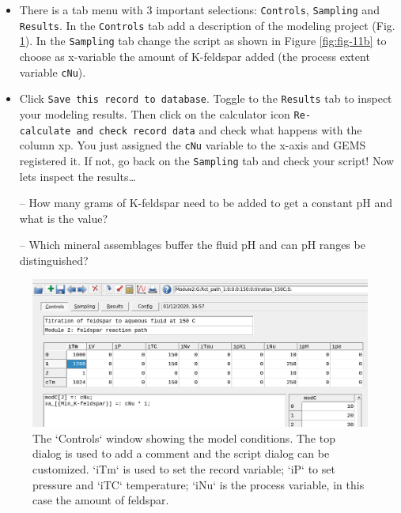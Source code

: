 \documentclass[
]{book}
\begin{document}
\begin{itemize}
\item
  There is a tab menu with 3 important selections: \texttt{Controls}, \texttt{Sampling} and \texttt{Results}. In the \texttt{Controls} tab add a description of the modeling project (Fig. \ref{fig:fig-10b}). In the \texttt{Sampling} tab change the script as shown in Figure \ref{fig:fig-11b} to choose as x-variable the amount of K-feldspar added (the process extent variable \texttt{cNu}).
\item
  Click \texttt{Save\ this\ record\ to\ database}. Toggle to the \texttt{Results} tab to inspect your modeling results. Then click on the calculator icon \texttt{Re-calculate\ and\ check\ record\ data} and check what happens with the column xp. You just assigned the \texttt{cNu} variable to the x-axis and GEMS registered it. If not, go back on the \texttt{Sampling} tab and check your script! Now lets inspect the results\ldots{}

  -- How many grams of K-feldspar need to be added to get a constant pH and what is the value?

  -- Which mineral assemblages buffer the fluid pH and can pH ranges be distinguished?
\end{itemize}

\begin{figure}
\includegraphics[width=1\linewidth]{figures/module2/fig-10} \caption{The `Controls` window showing the model conditions. The top dialog is used to add a comment and the script dialog can be customized. `iTm` is used to set the record variable; `iP` to set pressure and `iTC` temperature; `iNu` is the process variable, in this case the amount of feldspar.}\label{fig:fig-10b}
\end{figure}
\end{document}
